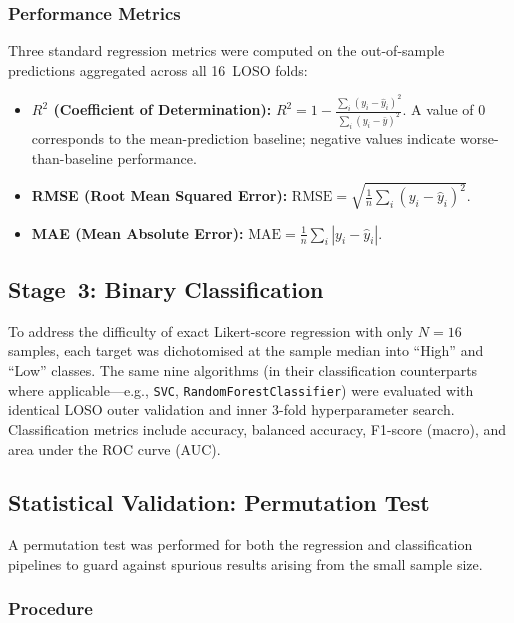 \subsubsection{Performance Metrics}

Three standard regression metrics were computed on the out-of-sample predictions aggregated across all 16~LOSO folds:
\begin{itemize}
\item \textbf{$R^{2}$ (Coefficient of Determination):}
      $R^{2} = 1 - \frac{\sum_{i}(y_i - \hat{y}_i)^2}
                         {\sum_{i}(y_i - \bar{y})^2}$.
      A value of 0 corresponds to the mean-prediction baseline;
      negative values indicate worse-than-baseline performance.
\item \textbf{RMSE (Root Mean Squared Error):}
      $\mathrm{RMSE} = \sqrt{\frac{1}{n}\sum_{i}(y_i-\hat{y}_i)^2}$.
\item \textbf{MAE (Mean Absolute Error):}
      $\mathrm{MAE} = \frac{1}{n}\sum_{i}|y_i-\hat{y}_i|$.
\end{itemize}

\subsection{Stage~3: Binary Classification}
\label{sec:class_method}

To address the difficulty of exact Likert-score regression with only $N=16$ samples, each target was dichotomised at the sample median into ``High'' and ``Low'' classes. The same nine algorithms (in their classification counterparts where applicable---e.g., \texttt{SVC}, \texttt{RandomForestClassifier}) were evaluated with identical LOSO outer validation and inner 3-fold hyperparameter search. Classification metrics include accuracy, balanced accuracy, F1-score (macro), and area under the ROC curve (AUC).

\subsection{Statistical Validation: Permutation Test}
\label{sec:perm_method}

A permutation test was performed for both the regression and classification pipelines to guard against spurious results arising from the small sample size.

\subsubsection{Procedure}

